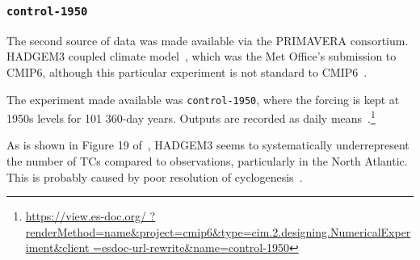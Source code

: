 \subsubsection{\texttt{control-1950}}
\label{sec:control-1950-intro}

The second source of data was made available via the PRIMAVERA consortium.
HADGEM3 coupled climate model~\cite{williams2018met, FurtherInfo},
which was the Met Office's submission to CMIP6,
although this particular experiment is not standard to CMIP6~\cite{eyring2016overview}.

The experiment made available was \texttt{control-1950}, where the forcing is kept at
1950s levels for 101 360-day years. Outputs are recorded as daily means~\cite{williams2018met, FurtherInfo}.\footnote{\url{https://view.es-doc.org/
        ?renderMethod=name&project=cmip6&type=cim.2.designing.NumericalExperiment&client
        =esdoc-url-rewrite&name=control-1950}}

As is shown in Figure 19 of~\cite{williams2018met},
HADGEM3 seems to systematically underrepresent the number of TCs compared to observations,
 particularly in the North Atlantic.
 This is probably caused by poor resolution of cyclogenesis~\cite{tomassini2017interaction}.
